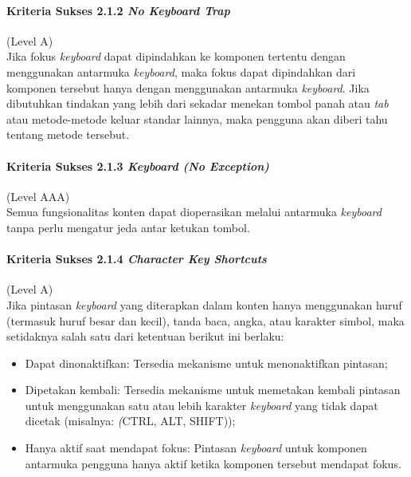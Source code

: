 \paragraph{Kriteria Sukses 2.1.2 \textit{No Keyboard Trap}}
\label{sec:kriteria_sukses_2.1.2}
(Level A)\\

Jika fokus \textit{keyboard} dapat dipindahkan ke komponen tertentu dengan menggunakan antarmuka \textit{keyboard}, maka fokus dapat dipindahkan dari komponen tersebut hanya dengan menggunakan antarmuka \textit{keyboard}. Jika dibutuhkan tindakan yang lebih dari sekadar menekan tombol panah atau \textit{tab} atau metode-metode keluar standar lainnya, maka pengguna akan diberi tahu tentang metode tersebut.

\paragraph{Kriteria Sukses 2.1.3 \textit{Keyboard (No Exception)}}
\label{sec:kriteria_sukses_2.1.3}
(Level AAA)\\

Semua fungsionalitas konten dapat dioperasikan melalui antarmuka \textit{keyboard} tanpa perlu mengatur jeda antar ketukan tombol.

\paragraph{Kriteria Sukses 2.1.4 \textit{Character Key Shortcuts}}
\label{sec:kriteria_sukses_2.1.4}
(Level A)\\

Jika pintasan \textit{keyboard} yang diterapkan dalam konten hanya menggunakan huruf (termasuk huruf besar dan kecil), tanda baca, angka, atau karakter simbol, maka setidaknya salah satu dari ketentuan berikut ini berlaku:
\begin{itemize}
	\item Dapat dinonaktifkan: Tersedia mekanisme untuk menonaktifkan pintasan;
	\item Dipetakan kembali: Tersedia mekanisme untuk memetakan kembali pintasan untuk menggunakan satu atau lebih karakter \textit{keyboard} yang tidak dapat dicetak (misalnya: \textit(CTRL, ALT, SHIFT));
	\item Hanya aktif saat mendapat fokus: Pintasan \textit{keyboard} untuk komponen antarmuka pengguna hanya aktif ketika komponen tersebut mendapat fokus.
\end{itemize}

